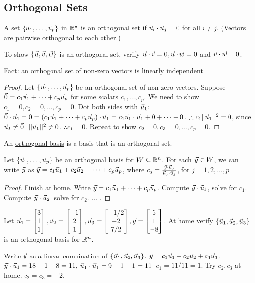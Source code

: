 \documentclass[10pt,a4paper]{article}
\begin{document}
\subsection{Orthogonal Sets}
\begin{definition}
	A set $\{\vec{u}_1,\dots,\vec{u}_p\}$ in $\mathbb{R}^n$ is an \underline{orthogonal set} if $\vec{u}_i\cdot\vec{u}_j = 0$ for all $i\neq j$. (Vectors are pairwise orthogonal to each other.)
\end{definition}
\begin{example}
	To show $\{\vec{u},\vec{v},\vec{w}\}$ is an orthogonal set, verify $\vec{u}\cdot\vec{v}=0,\vec{u}\cdot\vec{w}=0$ and $\vec{v}\cdot\vec{w}=0$.
\end{example}
\underline{Fact}: an orthogonal set of \underline{non-zero} vectors is linearly independent.
\begin{proof}
	Let $\{\vec{u}_1,\dots,\vec{u}_p\}$ be an orthogonal set of non-zero vectors. Suppose $\vec{0} = c_1 \vec{u}_1 + \cdots + c_p\vec{u}_p$ for some scalars $c_1,\dots,c_p$. We need to show $c_1=0,c_2=0,\dots,c_p=0$. Dot both sides with $\vec{u}_1$: $\vec{0}\cdot\vec{u}_1 = 0 = (c_1\vec{u}_1 + \cdots + c_p \vec{u}_p)\cdot\vec{u}_1 = c_1\vec{u}_1\cdot\vec{u}_1 + 0 + \cdots + 0$. $\therefore c_1||\vec{u}_1||^2 = 0$, since $\vec{u}_1\neq\vec{0}$, $||\vec{u}_1||^2\neq0$. $\therefore c_1 = 0$. Repeat to show $c_2=0,c_3=0,\dots,c_p=0$.
\end{proof}
\begin{definition}
	An \underline{orthogonal basis} is a basis that is an orthogonal set.
\end{definition}
\begin{theorem}
	Let $\{\vec{u}_1,\dots,\vec{u}_p\}$ be an orthogonal basis for $W\subseteq\mathbb{R}^n$. For each $\vec{y}\in W$, we can write $\vec{y}$ as $\vec{y}=c_1\vec{u}_1 + c_2\vec{u}_2 + \cdots + c_p\vec{u}_p$, where $c_j = \frac{\vec{y}\cdot\vec{u}_j}{\vec{u}_j\cdot\vec{u}_j}$, for $j=1,2,\dots,p$.
\end{theorem}
\begin{proof}
	Finish at home. Write $\vec{y}=c_1 \vec{u}_1 + \cdots + c_p \vec{u}_p$. Compute $\vec{y}\cdot\vec{u}_1$, solve for $c_1$. Compute $\vec{y}\cdot\vec{u}_2$, solve for $c_2$. $\dots$ .
\end{proof}
\begin{example}
	Let $\vec{u}_1 = \begin{bmatrix}3\\1\\1\end{bmatrix},\vec{u}_2=\begin{bmatrix}-1\\2\\1\end{bmatrix},\vec{u}_3 = \begin{bmatrix}-1/2\\-2\\7/2\end{bmatrix},\vec{y}=\begin{bmatrix}6\\1\\-8\end{bmatrix}$. At home verify $\{\vec{u}_1,\vec{u}_2,\vec{u}_3\}$ is an orthogonal basis for $\mathbb{R}^n$.
	
	Write $\vec{y}$ as a linear combination of $\{\vec{u}_1,\vec{u}_2,\vec{u}_3\}$. $\vec{y} = c_1 \vec{u}_1 + c_2\vec{u}_2 + c_3 \vec{u}_3$. $\vec{y}\cdot\vec{u}_1 = 18+1-8=11$, $\vec{u}_1\cdot\vec{u}_1 = 9+1+1 = 11$, $c_1 = 11/11 = 1$. Try $c_2,c_3$ at home. $c_2 = c_3 = -2$.
\end{example}
\end{document}
